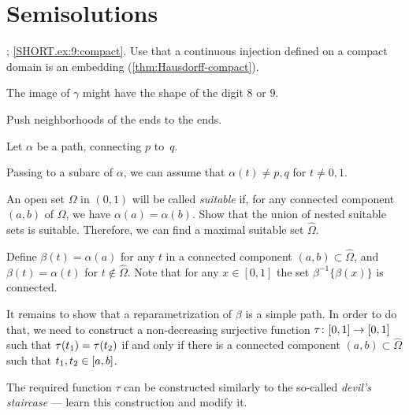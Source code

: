 \setcounter{eqtn}{0}


\chapter[Semisolutions]{\vspace*{-23mm} Semisolutions\vspace*{-12mm}}


\setcounter{eqtn}{0}

\parbf{\ref{ex:9}}; \ref{SHORT.ex:9:compact}. Use that a continuous injection defined on a compact domain is an embedding (\ref{thm:Hausdorff-compact}). 

 The image of $\gamma$ might have the shape of the digit $8$ or $9$.

Push neighborhoods of the ends to the ends.

Let $\alpha$ be a path, connecting $p$ to~$q$.

Passing to a subarc of $\alpha$,
we can assume that $\alpha(t)\ne p,q$ for $t\ne0,1$.

An open set $\Omega$ in $(0,1)$ will be called {}\emph{suitable}
if, for any connected component $(a,b)$ of $\Omega$, we have $\alpha(a)=\alpha(b)$.
Show that the union of nested suitable sets is suitable.
Therefore, we can find a maximal suitable set $\hat \Omega$.

Define $\beta(t)=\alpha(a)$ for any $t$ in a connected component $(a,b)\subset\hat \Omega$, and $\beta (t) = \alpha (t) $ for $t\notin\hat{\Omega}$.
Note that for any $x\in [0,1]$ the set $\beta^{-1}\{\beta(x)\}$ is connected.

It remains to show that a reparametrization of $\beta$ is a simple path.
In order to do that, we need to construct a non-decreasing surjective function $\tau\:[0,1]\z\to[0,1]$ such that 
$\tau(t_1)\z=\tau(t_2)$ if and only if there is a connected component $(a,b)\subset\hat \Omega$ such that $t_1,t_2\z\in [a,b]$.

The required function $\tau$ can be constructed similarly to the so-called {}\emph{devil's staircase} --- learn this construction and modify it.

